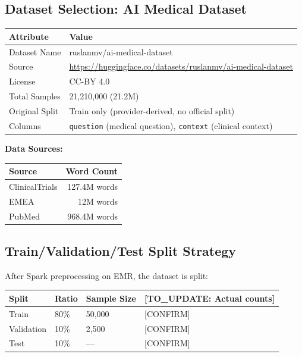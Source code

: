 \documentclass[11pt,a4paper]{article}
\begin{document}
\subsection{Dataset Selection: AI Medical Dataset}

\begin{table}[H]
\centering
\begin{tabular}{@{}ll@{}}
\toprule
\textbf{Attribute} & \textbf{Value} \\
\midrule
Dataset Name & ruslanmv/ai-medical-dataset \\
Source & \url{https://huggingface.co/datasets/ruslanmv/ai-medical-dataset} \\
License & CC-BY 4.0 \\
Total Samples & 21,210,000 (21.2M) \\
Original Split & Train only (provider-derived, no official split) \\
Columns & \texttt{question} (medical question), \texttt{context} (clinical context) \\
\bottomrule
\end{tabular}
\end{table}

\textbf{Data Sources:}
\begin{table}[H]
\centering
\begin{tabular}{@{}lr@{}}
\toprule
\textbf{Source} & \textbf{Word Count} \\
\midrule
ClinicalTrials & 127.4M words \\
EMEA & 12M words \\
PubMed & 968.4M words \\
\bottomrule
\end{tabular}
\end{table}

\subsection{Train/Validation/Test Split Strategy}

After Spark preprocessing on EMR, the dataset is split:

\begin{table}[H]
\centering
\begin{tabular}{@{}llll@{}}
\toprule
\textbf{Split} & \textbf{Ratio} & \textbf{Sample Size} & [TO\_UPDATE: Actual counts] \\
\midrule
Train & 80\% & 50,000 & [CONFIRM] \\
Validation & 10\% & 2,500 & [CONFIRM] \\
Test & 10\% & --- & [CONFIRM] \\
\bottomrule
\end{tabular}
\end{table}
\end{document}
